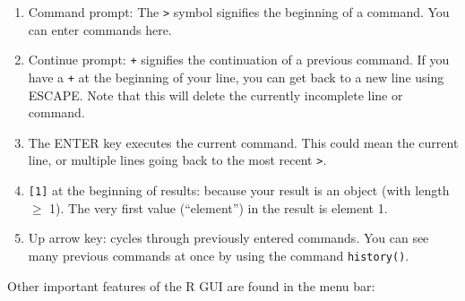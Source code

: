\documentclass[
  13,
  letterpaper,
]{report}
\begin{document}
\begin{enumerate}
\def\labelenumi{\arabic{enumi}.}
\item
  Command prompt: The \texttt{\textgreater{}} symbol signifies the
  beginning of a command. You can enter commands here.
\item
  Continue prompt: \texttt{+} signifies the continuation of a previous
  command. If you have a \texttt{+} at the beginning of your line, you
  can get back to a new line using ESCAPE. Note that this will delete
  the currently incomplete line or command.
\item
  The ENTER key executes the current command. This could mean the
  current line, or multiple lines going back to the most recent
  \texttt{\textgreater{}}.
\item
  \texttt{{[}1{]}} at the beginning of results: because your result is
  an object (with length \(\ge\) 1). The very first value (``element'')
  in the result is element 1.
\item
  Up arrow key: cycles through previously entered commands. You can see
  many previous commands at once by using the command
  \texttt{history()}.
\end{enumerate}

Other important features of the R GUI are found in the menu bar:
\end{document}
